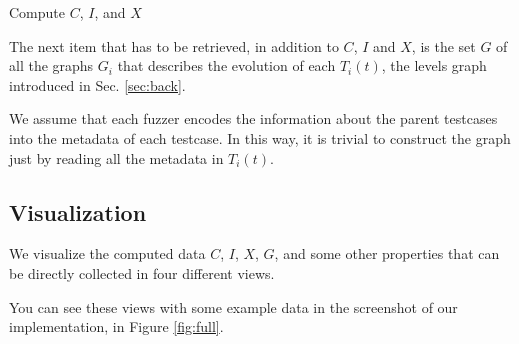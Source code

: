 \documentclass[conference,compsoc]{IEEEtran}
\begin{document}
\begin{algorithm}[h]
\DontPrintSemicolon


 \;
 \caption{Compute $C$, $I$, and $X$}
 \label{alg:data}
\end{algorithm}

The next item that has to be retrieved, in addition to $C$, $I$ and $X$, is the set $G$ of all the graphs $G_i$ that describes the evolution of each $T_i(t)$, the levels graph introduced in Sec. \ref{sec:back}.

We assume that each fuzzer encodes the information about the parent testcases into the metadata of each testcase. In this way, it is trivial to construct the graph just by reading all the metadata in $T_i(t)$.

\subsection{Visualization}

We visualize the computed data $C$, $I$, $X$, $G$, and some other properties that can be directly collected in four different views.

You can see these views with some example data in the screenshot of our implementation, in Figure \ref{fig:full}.
\end{document}
